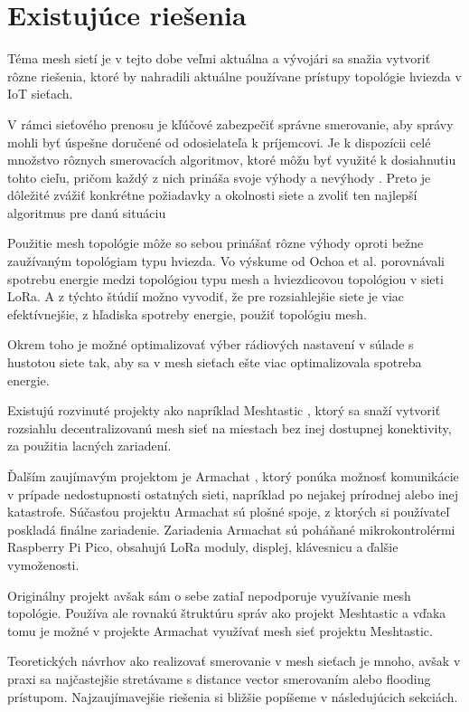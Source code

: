 \documentclass[slovak,master]{diploma}
\begin{document}
\chapter{Existujúce riešenia}
Téma mesh sietí je v tejto dobe veľmi aktuálna a vývojári sa snažia vytvoriť rôzne riešenia, ktoré by nahradili aktuálne používane 
prístupy topológie hviezda v IoT sieťach. 

V rámci sieťového prenosu je kľúčové zabezpečiť správne smerovanie, aby správy mohli byť úspešne doručené 
od odosielateľa k príjemcovi. Je k dispozícii celé množstvo rôznych smerovacích algoritmov, ktoré môžu byť využité 
k dosiahnutiu tohto cieľu, pričom každý z nich prináša svoje výhody a nevýhody \cite{ALOTAIBI2012940}. Preto je dôležité zvážiť 
konkrétne požiadavky a okolnosti siete a zvoliť ten najlepší algoritmus pre danú situáciu

Použitie mesh topológie môže so sebou prinášať rôzne výhody oproti bežne zaužívaným topológiam typu hviezda.
Vo výskume od Ochoa et al. \cite{8115793} porovnávali spotrebu energie medzi 
topológiou typu mesh a hviezdicovou topológiou v sieti LoRa. A z týchto štúdií možno vyvodiť, že pre rozsiahlejšie siete je viac
efektívnejšie, z hľadiska spotreby energie, použiť topológiu mesh. 

Okrem toho je možné optimalizovať výber rádiových nastavení v súlade s hustotou siete tak, 
aby sa v mesh sieťach ešte viac optimalizovala spotreba energie.


Existujú rozvinuté projekty ako napríklad Meshtastic \cite{meshtastic}, ktorý sa snaží vytvoriť rozsiahlu decentralizovanú mesh sieť na miestach bez inej dostupnej konektivity, 
za použitia lacných zariadení.

Ďalším zaujímavým projektom je Armachat \cite{armachat}, ktorý ponúka možnosť komunikácie v prípade nedostupnosti ostatných sieti, napríklad po nejakej prírodnej alebo inej katastrofe.
Súčasťou projektu Armachat sú plošné spoje, z ktorých si používateľ poskladá finálne zariadenie.
Zariadenia Armachat sú poháňané mikrokontrolérmi Raspberry Pi Pico, obsahujú LoRa moduly, displej, klávesnicu a ďalšie vymoženosti.

Originálny projekt avšak sám o sebe zatiaľ nepodporuje využívanie mesh topológie. Používa ale rovnakú štruktúru správ ako projekt Meshtastic a vďaka tomu je možné 
v projekte Armachat využívať mesh sieť projektu Meshtastic.

Teoretických návrhov ako realizovať smerovanie v mesh sieťach je mnoho, avšak v praxi sa najčastejšie stretávame s 
distance vector smerovaním alebo flooding prístupom. Najzaujímavejšie riešenia si bližšie popíšeme 
v následujúcich sekciách.
\end{document}
